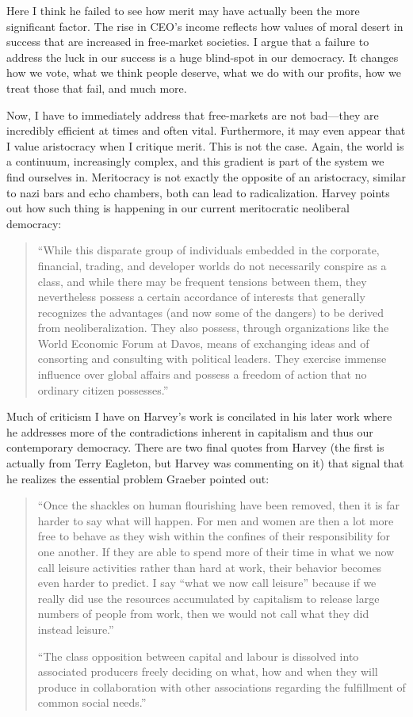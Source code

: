\documentclass[12pt,a4paper]{article}
\begin{document}
Here I think he failed to see how merit may have actually been the more significant factor. The rise in CEO's income reflects how values of moral desert in success that are increased in free-market societies. I argue that a failure to address the luck in our success is a huge blind-spot in our democracy. It changes how we vote, what we think people deserve, what we do with our profits, how we treat those that fail, and much more. 

Now, I have to immediately address that free-markets are not bad---they are incredibly efficient at times and often vital. Furthermore, it may even appear that I value aristocracy when I critique merit. This is not the case. Again, the world is a continuum, increasingly complex, and this gradient is part of the system we find ourselves in. Meritocracy is not exactly the opposite of an aristocracy, similar to nazi bars and echo chambers, both can lead to radicalization. Harvey points out how such thing is happening in our current meritocratic neoliberal democracy:
\begin{quote}\color{G-Moon}
   ``While this disparate group of individuals embedded in the 
corporate, financial, trading, and developer worlds do not 
necessarily conspire as a class, and while there may be frequent 
tensions between them, they nevertheless possess a certain 
accordance of interests that generally recognizes the 
advantages (and now some of the dangers) to be derived from 
neoliberalization. They also possess, through organizations like 
the World Economic Forum at Davos, means of exchanging 
ideas and of consorting and consulting with political leaders. 
They exercise immense influence over global affairs and possess 
a freedom of action that no ordinary citizen possesses.''~\cite{neo}
\end{quote}
Much of criticism I have on Harvey's work is concilated in his later work where he addresses more of the contradictions inherent in capitalism and thus our contemporary democracy. There are two final quotes from Harvey (the first is actually from Terry Eagleton, but Harvey was commenting on it) that signal that he realizes the essential problem Graeber pointed out:
\begin{quote}\color{G-Moon}
   ``Once the shackles on human flourishing have been removed, then it is far harder to say what will happen. For men and women are then a lot more free to behave as they wish within the confines of their responsibility for one another. If they are able to spend more of their time in what we now call leisure activities rather than hard at work, their behavior becomes even harder to predict. I say “what we now call leisure” because if we really did use the resources accumulated by capitalism to release large numbers of people from work, then we would not call what they did instead leisure.''~\cite{neo}


   ``The class opposition between capital and labour is dissolved into
associated producers freely deciding on what, how and when they will
produce in collaboration with other associations regarding the
fulfillment of common social needs.''~\cite{con}
\end{quote}
\end{document}
